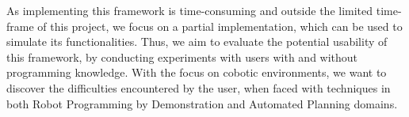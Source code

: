 \noindent As implementing this framework is time-consuming and outside the limited time-frame of this project, we focus on a partial implementation, which can be used to simulate its functionalities. Thus, we aim to evaluate the potential usability of this framework, by conducting experiments with users with and without programming knowledge. With the focus on cobotic environments, we want to discover the difficulties encountered by the user, when faced with techniques in both Robot Programming by Demonstration and Automated Planning domains.
